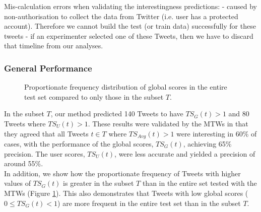 Mis-calculation errors when validating the interestingness predictions:
 - caused by non-authorisation to collect the data from Twitter (i.e. user has a protected account). Therefore we cannot build the test (or train data) successfully for these tweets
 - if an experimenter selected one of these Tweets, then we have to discard that timeline from our analyses.

\subsubsection{General Performance}

\begin{figure}[h]
\centering{
\begin{tikzpicture}
\begin{semilogyaxis}[
    symbolic x coords={[0-1), [1-2), [2-3), [3-4), [4-5), [5-100)},
        ylabel=Proportionate frequency,
		xlabel=$TS_G(t)$,
        legend pos=north east,
        legend style={nodes=right},
        ybar,
        bar width=7pt,
        legend entries={ Chosen Tweets ($T$),  All Tested Tweets}
        ]
   \addplot[plot 0,bar group size={0}{2}]
        coordinates {([0-1),76.30057803) ([1-2),7.514450867)  ([2-3),4.335260116) ([3-4), 1.445086705) ([4-5), 2.023121387) ([5-100), 6.936416185)};
        \addplot[plot 1,bar group size={1}{2}]
        coordinates { ([0-1),80.94365552) ([1-2),6.596426935)  ([2-3),3.710490151) ([3-4), 1.099404489) ([4-5), 0.961978928) ([5-100), 4.634448007)};
        
\end{semilogyaxis}
\end{tikzpicture}
}
\caption{Proportionate frequency distribution of global scores in the entire test set compared to only those in the subset $T$.}
\label{fig:hist}
\end{figure}

In the subset $T$, our method predicted 140 Tweets to have $TS_G(t) > 1$ and 80 Tweets where $TS_U(t) > 1$.  These results were validated by the MTWs in that they agreed that all Tweets $t \in T$ where $TS_{Avg}(t) > 1$ were interesting in 60\% of cases, with the performance of the global scores, $TS_{G}(t)$, achieving 65\% precision. The user scores, $TS_{U}(t)$, were less accurate and yielded a precision of around 55\%.\\
In addition, we show how the proportionate frequency of Tweets with higher values of $TS_G(t)$ is greater in the subset $T$ than in the entire set tested with the MTWs (Figure \ref{fig:hist}). This also demonstrates that Tweets with low global scores ($0 \leq TS_G(t) < 1$) are more frequent in the entire test set than in the subset $T$.


